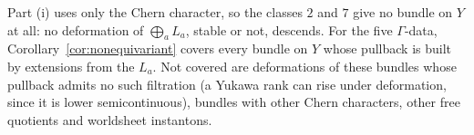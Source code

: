 \begin{remark}\label{rem:nonequivariantscope}
Part (i) uses only the Chern character, so the classes $2$ and $7$ give no
bundle on $Y$ at all: no deformation of $\bigoplus_aL_a$, stable or not,
descends. For the five $\Gamma$-data, Corollary~\ref{cor:nonequivariant}
covers every bundle on $Y$ whose pullback is built by extensions from the
$L_a$. Not covered are deformations of these bundles whose pullback admits
no such filtration (a Yukawa rank can rise under deformation, since it is
lower semicontinuous), bundles with other Chern characters, other free
quotients and worldsheet instantons.
\end{remark}
